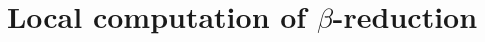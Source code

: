 

\title{Local computation of $\beta$-reduction}


\maketitle \tableofcontents \bigskip

         





